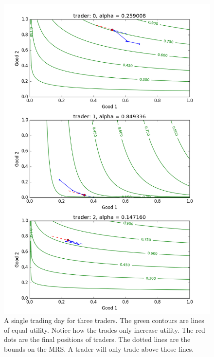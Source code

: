 \documentclass[12pt,a4paper,titlepage]{article}
\begin{document}
\begin{figure}[H]
    \centering
    \includegraphics[width=\textwidth]{allocations_(seed_13).png}
    \caption{
      A single trading day for three traders.
      The green contours are lines of equal utility.
      Notice how the trades only increase utility.
      The red dots are the final positions of traders.
      The dotted lines are the bounds on the MRS.
      A trader will only trade above those lines.
    }
    \label{fig:day}
\end{figure}
\end{document}
